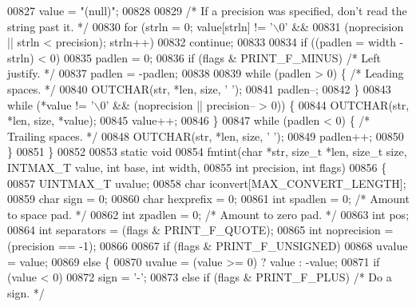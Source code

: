 \begin{DoxyCode}
{{{{{00827         value = \textcolor{stringliteral}{"(null)"};
00828 
00829     \textcolor{comment}{/* If a precision was specified, don't read the string past it. */}
00830     \textcolor{keywordflow}{for} (strln = 0; value[strln] != \textcolor{charliteral}{'\(\backslash\)0'} &&
00831         (noprecision || strln < precision); strln++)
00832         \textcolor{keywordflow}{continue};
00833 
00834     \textcolor{keywordflow}{if} ((padlen = width - strln) < 0)
00835         padlen = 0;
00836     \textcolor{keywordflow}{if} (flags & PRINT\_F\_MINUS)  \textcolor{comment}{/* Left justify. */}
00837         padlen = -padlen;
00838 
00839     \textcolor{keywordflow}{while} (padlen > 0) \{    \textcolor{comment}{/* Leading spaces. */}
00840         OUTCHAR(str, *len, size, \textcolor{charliteral}{' '});
00841         padlen--;
00842     \}
00843     \textcolor{keywordflow}{while} (*value != \textcolor{charliteral}{'\(\backslash\)0'} && (noprecision || precision-- > 0)) \{
00844         OUTCHAR(str, *len, size, *value);
00845         value++;
00846     \}
00847     \textcolor{keywordflow}{while} (padlen < 0) \{    \textcolor{comment}{/* Trailing spaces. */}
00848         OUTCHAR(str, *len, size, \textcolor{charliteral}{' '});
00849         padlen++;
00850     \}
00851 \}
00852 
00853 \textcolor{keyword}{static} \textcolor{keywordtype}{void}
00854 fmtint(\textcolor{keywordtype}{char} *str, \textcolor{keywordtype}{size\_t} *len, \textcolor{keywordtype}{size\_t} size, INTMAX\_T value, \textcolor{keywordtype}{int} base, \textcolor{keywordtype}{int} width,
00855        \textcolor{keywordtype}{int} precision, \textcolor{keywordtype}{int} flags)
00856 \{
00857     UINTMAX\_T uvalue;
00858     \textcolor{keywordtype}{char} iconvert[MAX\_CONVERT\_LENGTH];
00859     \textcolor{keywordtype}{char} sign = 0;
00860     \textcolor{keywordtype}{char} hexprefix = 0;
00861     \textcolor{keywordtype}{int} spadlen = 0;    \textcolor{comment}{/* Amount to space pad. */}
00862     \textcolor{keywordtype}{int} zpadlen = 0;    \textcolor{comment}{/* Amount to zero pad. */}
00863     \textcolor{keywordtype}{int} pos;
00864     \textcolor{keywordtype}{int} separators = (flags & PRINT\_F\_QUOTE);
00865     \textcolor{keywordtype}{int} noprecision = (precision == -1);
00866 
00867     \textcolor{keywordflow}{if} (flags & PRINT\_F\_UNSIGNED)
00868         uvalue = value;
00869     \textcolor{keywordflow}{else} \{
00870         uvalue = (value >= 0) ? value : -value;
00871         \textcolor{keywordflow}{if} (value < 0)
00872             sign = \textcolor{charliteral}{'-'};
00873         \textcolor{keywordflow}{else} \textcolor{keywordflow}{if} (flags & PRINT\_F\_PLUS)  \textcolor{comment}{/* Do a sign. */}
}}}}}
\end{DoxyCode}

